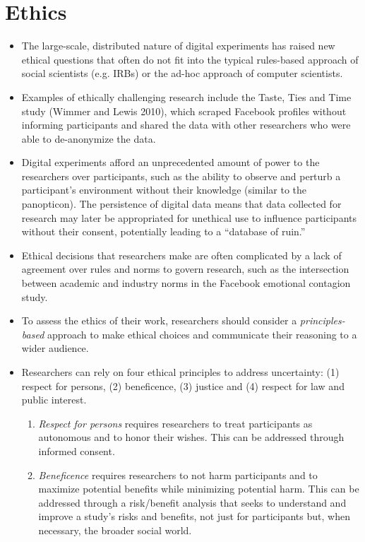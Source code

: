 \documentclass[11pt,letterpaper]{article}
\begin{document}
\section{Ethics}
\begin{itemize}
\item The large-scale, distributed nature of digital experiments has raised new ethical questions that often do not fit into the typical rules-based approach of social scientists (e.g. IRBs) or the ad-hoc approach of computer scientists.
\item Examples of ethically challenging research include the Taste, Ties and Time study (Wimmer and Lewis 2010), which scraped Facebook profiles without informing participants and shared the data with other researchers who were able to de-anonymize the data.
\item Digital experiments afford an unprecedented amount of power to the researchers over participants, such as the ability to observe and perturb a participant's environment without their knowledge (similar to the panopticon). The persistence of digital data means that data collected for research may later be appropriated for unethical use to influence participants without their consent, potentially leading to a ``database of ruin.''
\item Ethical decisions that researchers make are often complicated by a lack of agreement over rules and norms to govern research, such as the intersection between academic and industry norms in the Facebook emotional contagion study.
\item To assess the ethics of their work, researchers should consider a \emph{principles-based} approach to make ethical choices and communicate their reasoning to a wider audience.
\item Researchers can rely on four ethical principles to address uncertainty: (1) respect for persons, (2) beneficence, (3) justice and (4) respect for law and public interest.
\begin{enumerate}
\item \emph{Respect for persons} requires researchers to treat participants as autonomous and to honor their wishes. This can be addressed through informed consent.
\item \emph{Beneficence} requires researchers to not harm participants and to maximize potential benefits while minimizing potential harm. This can be addressed through a risk/benefit analysis that seeks to understand and improve a study's risks and benefits, not just for participants but, when necessary, the broader social world. 

\end{enumerate}
\end{itemize}
\end{document}
